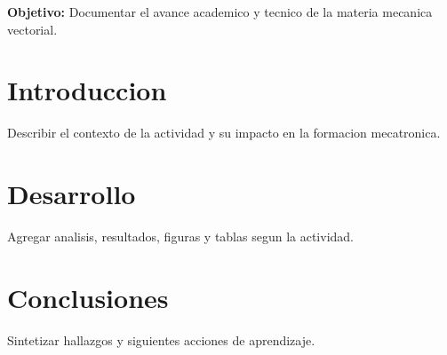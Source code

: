 \documentclass[spanish,letterpaper,oneside]{article}
\begin{document}
\templatePortrait
\templatePagecfg
\onehalfspacing

\begin{abstractd}
\textbf{Objetivo:} Documentar el avance academico y tecnico de la materia mecanica vectorial.
\end{abstractd}

\templateIndex
\templateFinalcfg

\section{Introduccion}
Describir el contexto de la actividad y su impacto en la formacion mecatronica.

\section{Desarrollo}
Agregar analisis, resultados, figuras y tablas segun la actividad.

\section{Conclusiones}
Sintetizar hallazgos y siguientes acciones de aprendizaje.



\end{document}
